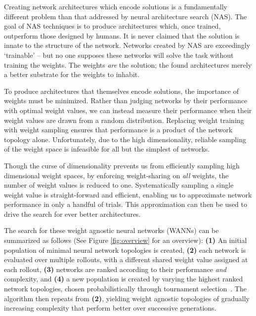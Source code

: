 
Creating network architectures which encode solutions is a fundamentally different problem than that addressed by neural architecture search (NAS). 
The goal of NAS techniques is to produce architectures which, once trained, outperform those designed by humans. 
%
It is never claimed that the solution is innate to the structure of the network. 
% 
Networks created by NAS are exceedingly `trainable' -- but no one supposes these networks will solve the task without training the weights. 
The weights \textit{are} the solution; the found architectures merely a better substrate for the weights to inhabit.

To produce architectures that themselves encode solutions, the importance of weights must be minimized. 
%
Rather than judging networks by their performance with optimal weight values, we can instead measure their performance when their weight values are drawn from a random distribution.
%
Replacing weight training with weight sampling ensures that performance is a product of the network topology alone.
%
Unfortunately, due to the high dimensionality, reliable sampling of the weight space is infeasible for all but the simplest of networks.

Though the curse of dimensionality prevents us from efficiently sampling high dimensional weight spaces,  
by enforcing weight-sharing on \textit{all} weights, the number of weight values is reduced to one.
%
Systematically sampling a single weight value is straight-forward and efficient, enabling us to approximate network performance in only a handful of trials.  
%
This approximation can then be used to drive the search for ever better architectures. 


The search for these weight agnostic neural networks (WANNs) can be summarized as follows (See Figure \ref{fig:overview} for an overview): 
%
\textbf{(1)} An initial population of minimal neural network topologies is created, 
%
\textbf{(2)} each network is evaluated over multiple rollouts, with a different shared weight value assigned at each rollout, 
%
\textbf{(3)} networks are ranked according to their performance \textit{and} complexity, and 
%
\textbf{(4)} a new population is created by varying the highest ranked network topologies, chosen probabilistically through tournament selection~\cite{tournamentSelection}. 
%
The algorithm then repeats from \textbf{(2)}, yielding weight agnostic topologies of gradually increasing complexity that perform better over successive generations.


